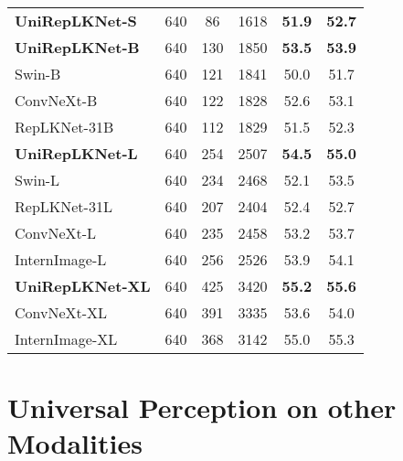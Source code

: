 \documentclass[10pt,twocolumn,letterpaper]{article}
\begin{document}
\begin{table}[t]
\begin{tabular}{l|c|c|c|cc}
        \hline
        \rowcolor{gray!20}
        \textbf{UniRepLKNet-S}    &   640    &  86 & 1618  &   \textbf{51.9}  &   \textbf{52.7}\\      
        \rowcolor{gray!20}
        \textbf{UniRepLKNet-B}    &   640    &  130  & 1850 &   \textbf{53.5}    &   \textbf{53.9}\\
        Swin-B~\cite{liu2021swin}    &   640 &   121 &   1841   & 50.0   &   51.7\\
        ConvNeXt-B~\cite{liu2022convnet}      &   640     &   122     &   1828    &    52.6   &   53.1\\
        RepLKNet-31B~\cite{ding2022scaling}   &   640       &   112 &   1829    &   51.5    &   52.3 \\ 
        \hline
        \rowcolor{gray!20}
        \textbf{UniRepLKNet-L}    &   640    &   254  &   2507   &   \textbf{54.5}    &   \textbf{55.0}   \\
        Swin-L~\cite{liu2021swin} 
        & 640 & 234 & 2468 & 52.1 & 53.5 \\
        RepLKNet-31L~\cite{ding2022scaling} 
        & 640 & 207 & 2404 & 52.4 & 52.7 \\
        ConvNeXt-L~\cite{liu2022convnet} 
        & 640 & 235 & 2458 & 53.2 & 53.7 \\
        
        
        InternImage-L~\cite{wang2023internimage}
        & 640 & 256  & 2526  & 53.9 & 54.1 \\
        \hline
        \rowcolor{gray!20}
        \textbf{UniRepLKNet-XL}    &   640    &   425  &   3420   &   \textbf{55.2}    &   \textbf{55.6}   \\
        ConvNeXt-XL~\cite{liu2022convnet}
        & 640 & 391 & 3335 & 53.6 & 54.0 \\
        InternImage-XL~\cite{wang2023internimage}
        & 640 & 368 & 3142 & 55.0 & 55.3 \\
        
        
        \hline
               
    \end{tabular}
    \label{tab:seg}
    \vspace{-0.2in}
\end{table}  

\section{Universal Perception on other Modalities}
\end{document}

